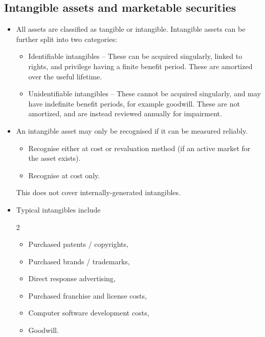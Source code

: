 \documentclass[../notes_compiled.tex]{subfiles}
\begin{document}
\subsection{Intangible assets and marketable securities}
\label{intangibles}
\begin{itemize}
\item All assets are classified as tangible or intangible. Intangible assets can be further split into two categories:
\begin{itemize}
\item Identifiable intangibles -- These can be acquired singularly, linked to rights, and privilege having a finite benefit period. These are amortized over the useful lifetime.
\item Unidentifiable intangibles -- These cannot be acquired singularly, and may have indefinite benefit periods, for example goodwill. These are not amortized, and are instead reviewed annually for impairment.
\end{itemize}

\item An intangible asset may only be recognised if it can be measured reliably.
\begin{itemize}
\item[IFRS] Recognise either at cost or revaluation method (if an active market for the asset exists).
\item[US GAAP] Recognise at cost only.
\end{itemize}
This does not cover internally-generated intangibles.

\item Typical intangibles include
\begin{multicols}{2}
\begin{itemize}
\item Purchased patents / copyrights,
\item Purchased brands / trademarks,
\item Direct response advertising,
\item Purchased franchise and license costs,
\item Computer software development costs,
\item Goodwill.

\end{itemize}
\end{multicols}


\end{itemize}
\end{document}
